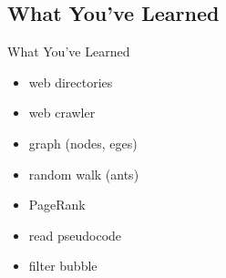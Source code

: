 \subsection{What You've Learned}
\begin{frame}{What You've Learned}
    \begin{itemize}
        \item web directories
        \item web crawler
        \item graph (nodes, eges)
        \item random walk (ants)
        \item PageRank
        \item read pseudocode
	\item filter bubble
    \end{itemize}
\end{frame}
